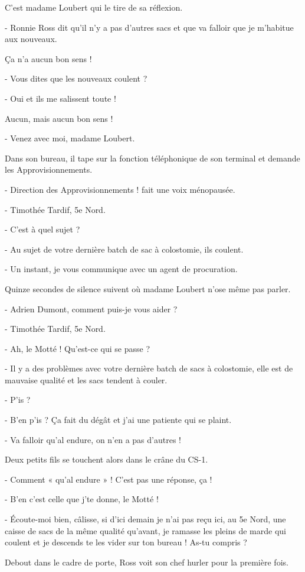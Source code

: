 C’est madame Loubert qui le tire de sa réflexion.

- Ronnie Ross dit qu’il n’y a pas d’autres sacs et que va falloir que je m’habitue aux nouveaux.

Ça n’a aucun bon sens !

- Vous dites que les nouveaux coulent ?

- Oui et ils me salissent toute !

Aucun, mais aucun bon sens !

- Venez avec moi, madame Loubert.

Dans son bureau, il tape sur la fonction téléphonique de son terminal et demande les Approvisionnements.

- Direction des Approvisionnements ! fait une voix ménopausée.

- Timothée Tardif, 5e Nord.

- C’est à quel sujet ?

- Au sujet de votre dernière batch de sac à colostomie, ils coulent.

- Un instant, je vous communique avec un agent de procuration.

Quinze secondes de silence suivent où madame Loubert n’ose même pas parler.

- Adrien Dumont, comment puis-je vous aider ?

- Timothée Tardif, 5e Nord.

- Ah, le Motté ! Qu’est-ce qui se passe ?

- Il y a des problèmes avec votre dernière batch de sacs à colostomie, elle est de mauvaise qualité et les sacs tendent à couler.

- P’is ?

- B’en p’is ? Ça fait du dégât et j’ai une patiente qui se plaint.

- Va falloir qu’al endure, on n’en a pas d’autres !

Deux petits fils se touchent alors dans le crâne du CS-1.

- Comment « qu’al endure » ! C’est pas une réponse, ça !

- B’en c’est celle que j’te donne, le Motté !

- Écoute-moi bien, câlisse, si d’ici demain je n’ai pas reçu ici, au 5e Nord, une caisse de sacs de la même qualité qu’avant, je ramasse les pleins de marde qui coulent et je descends te les vider sur ton bureau ! As-tu compris ?

Debout dans le cadre de porte, Ross voit son chef hurler pour la première fois.

